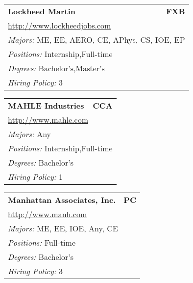 \documentclass[twoside]{article}
\begin{document}
\begin{center}
\begin{multicols}{3}
\begin{FlushLeft}
\begin{minipage}{.9\columnwidth}
\end{minipage}
 
\begin{minipage}{.9\columnwidth}\begin{tabularx}{.95\columnwidth}{Xr}
                 {\Large\bf Lockheed Martin} & {\Large\bf FXB}\\
    \multicolumn{2}{p{.95\columnwidth}}{\url{http://www.lockheedjobs.com}}\\
    \multicolumn{2}{p{.95\columnwidth}}{\emph{Majors:} ME, EE, AERO, CE, APhys, CS, IOE, EP}\\
    \multicolumn{2}{p{.95\columnwidth}}{\emph{Positions:} Internship,Full-time}\\
    \multicolumn{2}{p{.95\columnwidth}}{\emph{Degrees:} Bachelor's,Master's}\\
    \multicolumn{2}{p{.95\columnwidth}}{\emph{Hiring Policy:} 3}\\
    \end{tabularx}
    
\end{minipage}
 
\begin{minipage}{.9\columnwidth}\begin{tabularx}{.95\columnwidth}{Xr}
                 {\Large\bf MAHLE Industries} & {\Large\bf CCA}\\
    \multicolumn{2}{p{.95\columnwidth}}{\url{http://www.mahle.com}}\\
    \multicolumn{2}{p{.95\columnwidth}}{\emph{Majors:} Any}\\
    \multicolumn{2}{p{.95\columnwidth}}{\emph{Positions:} Internship,Full-time}\\
    \multicolumn{2}{p{.95\columnwidth}}{\emph{Degrees:} Bachelor's}\\
    \multicolumn{2}{p{.95\columnwidth}}{\emph{Hiring Policy:} 1}\\
    \end{tabularx}
    
\end{minipage}
 
\begin{minipage}{.9\columnwidth}\begin{tabularx}{.95\columnwidth}{Xr}
                 {\Large\bf Manhattan Associates, Inc.} & {\Large\bf PC}\\
    \multicolumn{2}{p{.95\columnwidth}}{\url{http://www.manh.com}}\\
    \multicolumn{2}{p{.95\columnwidth}}{\emph{Majors:} ME, EE, IOE, Any, CE}\\
    \multicolumn{2}{p{.95\columnwidth}}{\emph{Positions:} Full-time}\\
    \multicolumn{2}{p{.95\columnwidth}}{\emph{Degrees:} Bachelor's}\\
    \multicolumn{2}{p{.95\columnwidth}}{\emph{Hiring Policy:} 3}\\
    \end{tabularx}
    

\end{minipage}
\end{FlushLeft}
\end{multicols}
\end{center}
\end{document}
